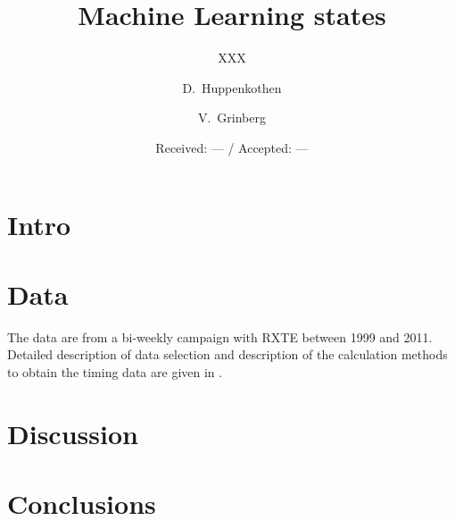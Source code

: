 \documentclass{aa}
\begin{document}
\title{Machine Learning states} 
\subtitle{XXX}


\author{\mbox{D.~Huppenkothen\inst{\ref{affil:nyu}}} \and
\mbox{V.~Grinberg\inst{\ref{affil:mit}}}
} 
\date {Received: --- / Accepted: ---}



\maketitle

\section{Intro}

\section{Data}

The data are from a bi-weekly campaign with RXTE between 1999 and
2011. Detailed description of data selection and description of the
calculation methods to obtain the timing data are given in \citep{Grinberg_2014a}.

\section{Discussion}

\section{Conclusions}

 

\end{document}
